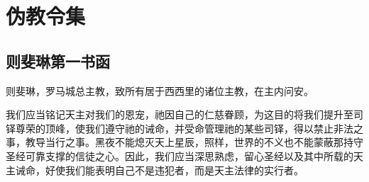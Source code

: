 
\chapter{伪教令集}



\section{则斐琳第一书函}

\par

则斐琳，罗马城总主教，致所有居于西西里的诸位主教，在主内问安。\par

我们应当铭记天主对我们的恩宠，祂因自己的仁慈眷顾，为这目的将我们提升至司铎尊荣的顶峰，使我们遵守祂的诫命，并受命管理祂的某些司铎，得以禁止非法之事，教导当行之事。黑夜不能熄灭天上星辰，照样，世界的不义也不能蒙蔽那持守圣经可靠支撑的信徒之心。因此，我们应当深思熟虑，留心圣经以及其中所载的天主诫命，好使我们能表明自己不是违犯者，而是天主法律的实行者。\par

